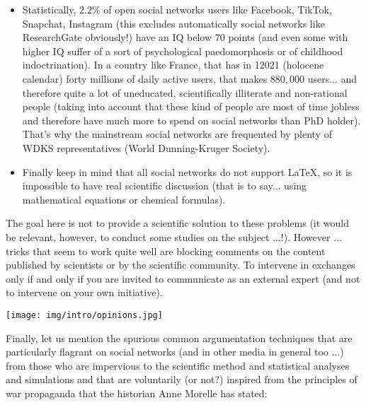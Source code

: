 \begin{itemize}
		\item Statistically, $2.2\%$ of open social networks users like Facebook, TikTok, Snapchat, Instagram (this excludes automatically social networks like ResearchGate obviously!) have an IQ below $70$ points (and even some with higher IQ suffer of a sort of psychological paedomorphosis or of childhood indoctrination). In a country like France, that has in 12021 (holocene calendar) forty millions of daily active users, that makes $880,000$ users... and therefore quite a lot of uneducated, scientifically illiterate and non-rational people (taking into account that these kind of people are most of time jobless and therefore have much more to spend on social networks than PhD holder). That's why the mainstream social networks are frequented by plenty of WDKS representatives (World Dunning-Kruger Society).
	
		\item Finally keep in mind that all social networks do not support \LaTeX{}, so it is impossible to have real scientific discussion (that is to say... using mathematical equations or chemical formulas).
	\end{itemize}
	The goal here is not to provide a scientific solution to these problems (it would be relevant, however, to conduct some studies on the subject ...!). However ... tricks that seem to work quite well are blocking comments on the content published by scientists or by the scientific community. To intervene in exchanges only if and only if you are invited to communicate as an external expert (and not to intervene on your own initiative).
	\begin{center}
		\texttt{[image: img/intro/opinions.jpg]}
	\end{center}	
	Finally, let us mention the spurious common argumentation techniques that are particularly flagrant on social networks (and in other media in general too ...) from those who are impervious to the scientific method and statistical analyses and simulations and that are voluntarily (or not?) inspired from the principles of war propaganda that the historian Anne Morelle has stated:
